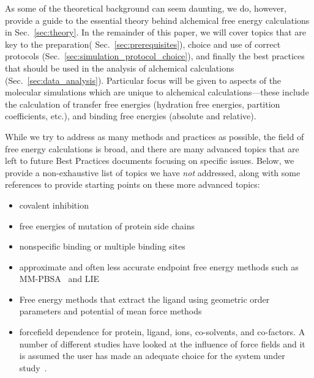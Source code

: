 \documentclass[9pt,bestpractices]{livecoms}
\begin{document}
As some of the theoretical background can seem daunting, we do, however, provide a guide to the essential theory behind alchemical free energy calculations in Sec.~\ref{sec:theory}.
In the remainder of this paper, we will cover topics that are key to the preparation( Sec.~\ref{sec:prerequisites}), choice and use of correct protocols (Sec.~\ref{sec:simulation_protocol_choice}), and finally the best practices that should be used in the analysis of alchemical calculations (Sec.~\ref{sec:data_analysis}). 
Particular focus will be given to aspects of the molecular simulations which are unique to alchemical calculations---these include the calculation of transfer free energies (hydration free energies, partition coefficients, etc.), and binding free energies (absolute and relative).


While we try to address as many methods and practices as possible, the field of free energy calculations is broad, and there are many advanced topics that are left to future Best Practices documents focusing on specific issues. 
Below, we provide a non-exhaustive list of topics we have \emph{not} addressed, along with some references to provide starting points on these more advanced topics:
\begin{itemize}
\item covalent inhibition~\cite{lameira2019predicting}
\item free energies of mutation of protein side chains~\cite{gapsys2016accurate, aldeghi2018accurate}
\item nonspecific binding or multiple binding sites~\cite{gill2018binding}
\item approximate and often less accurate endpoint free energy methods such as MM-PBSA~\cite{genheden2015mm} and LIE~\cite{gutierrez-de-teran2012linear}
\item Free energy methods that extract the ligand using geometric order parameters and potential of mean force methods~\cite{heinzelmann2017attachpullrelease}
\item forcefield dependence for protein, ligand, ions, co-solvents, and co-factors. A number of different studies have looked at the influence of force fields and it is assumed the user has made an adequate choice for the system under study~\cite{loeffler2018reproducibility, vassetti2019assessment, lopes2015current}. 
\end{itemize}
\end{document}
